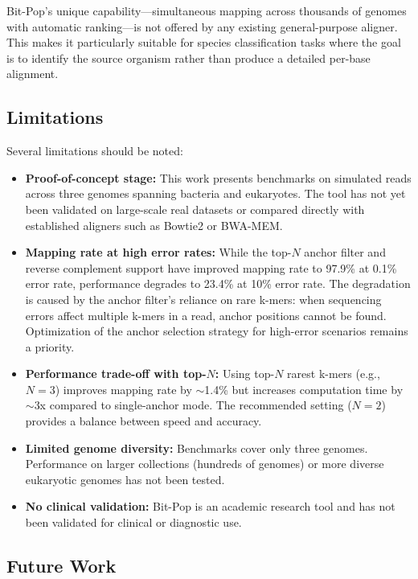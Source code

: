 \documentclass[10pt]{article}
\begin{document}
Bit-Pop's unique capability---simultaneous mapping across thousands of genomes with automatic ranking---is not offered by any existing general-purpose aligner. This makes it particularly suitable for species classification tasks where the goal is to identify the source organism rather than produce a detailed per-base alignment.

\subsection{Limitations}

Several limitations should be noted:
\begin{itemize}
\item \textbf{Proof-of-concept stage:} This work presents benchmarks on simulated reads across three genomes spanning bacteria and eukaryotes. The tool has not yet been validated on large-scale real datasets or compared directly with established aligners such as Bowtie2 or BWA-MEM.
\item \textbf{Mapping rate at high error rates:} While the top-$N$ anchor filter and reverse complement support have improved mapping rate to 97.9\% at 0.1\% error rate, performance degrades to 23.4\% at 10\% error rate. The degradation is caused by the anchor filter's reliance on rare k-mers: when sequencing errors affect multiple k-mers in a read, anchor positions cannot be found. Optimization of the anchor selection strategy for high-error scenarios remains a priority.
\item \textbf{Performance trade-off with top-$N$:} Using top-$N$ rarest k-mers (e.g., $N=3$) improves mapping rate by $\sim$1.4\% but increases computation time by $\sim$3x compared to single-anchor mode. The recommended setting ($N=2$) provides a balance between speed and accuracy.
\item \textbf{Limited genome diversity:} Benchmarks cover only three genomes. Performance on larger collections (hundreds of genomes) or more diverse eukaryotic genomes has not been tested.
\item \textbf{No clinical validation:} Bit-Pop is an academic research tool and has not been validated for clinical or diagnostic use.
\end{itemize}

\subsection{Future Work}
\end{document}
